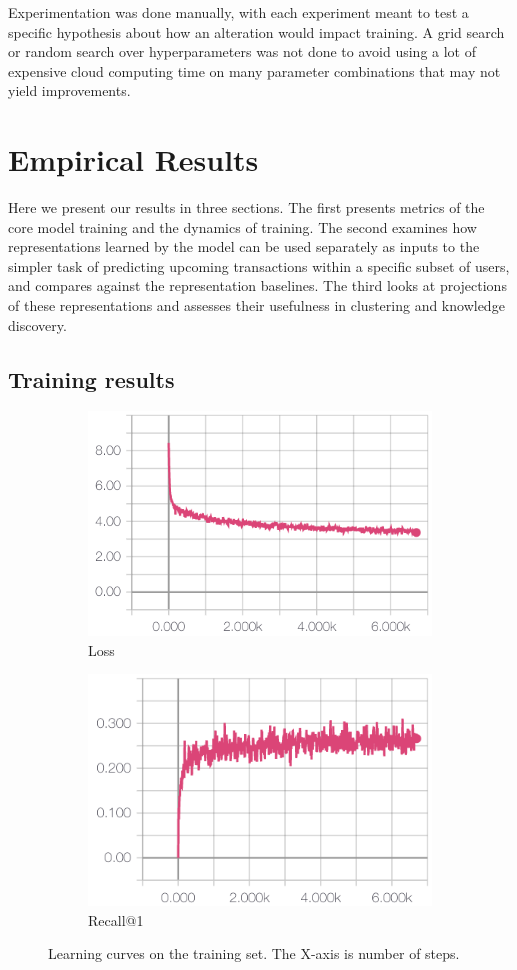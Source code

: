\documentclass{article}
\begin{document}
Experimentation was done manually, with each experiment meant to test a specific hypothesis about how an alteration would impact training. A grid search or random search over hyperparameters was not done to avoid using a lot of expensive cloud computing time on many parameter combinations that may not yield improvements.

\section{Empirical Results}
Here we present our results in three sections. The first presents metrics of the core model training and the dynamics of training. The second examines how representations learned by the model can be used separately as inputs to the simpler task of predicting upcoming transactions within a specific subset of users, and compares against the representation baselines. The third looks at projections of these representations and assesses their usefulness in clustering and knowledge discovery.

\subsection{Training results}

\begin{figure}
\centering
\begin{subfigure}{.5\textwidth}
  \centering
  \includegraphics[width=.6\linewidth]{training-loss-curve}
  \caption{Loss}
  \label{training-loss-curve}
\end{subfigure}%
\begin{subfigure}{.5\textwidth}
  \centering
  \includegraphics[width=.6\linewidth]{training-recall-curve}
  \caption{Recall@1}
  \label{training-recall-curve}
\end{subfigure}
\caption{Learning curves on the training set. The X-axis is number of steps.}
\label{curves}
\end{figure}
\end{document}
